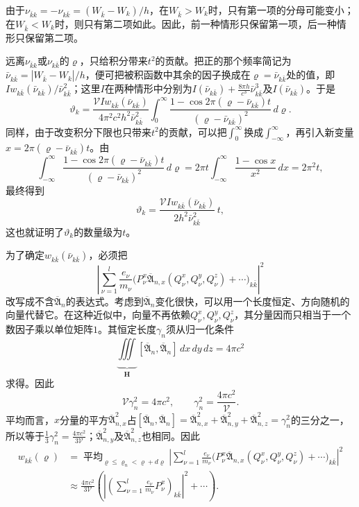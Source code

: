 \documentclass[fontsize=13pt,twoside,openany,headings=normal,parskip=false,bookmarkpackage=false,DIV=calc]{scrbook}
\begin{document}
由于$\nu_{\bar k k}=-\nu_{k\bar k}=(W_{\bar k}-W_k)/h$，在$W_{\bar k}>W_k$时，只有第一项的分母可能变小；在$W_{\bar k}<W_k$时，则只有第二项如此。因此，前一种情形只保留第一项，后一种情形只保留第二项。

远离$\nu_{\bar k k}$或$\nu_{k\bar k}$的$\varrho$，只给积分带来$t^2$的贡献。把正的那个频率简记为$\bar\nu_{k\bar k}=|W_{\bar k}-W_k|/h$，\hypertarget{origpage-155}{}\label{origpage-155}便可把被积函数中其余的因子换成在$\varrho=\bar\nu_{k\bar k}$处的值，即$I w_{k\bar k}(\bar\nu_{k\bar k})/\bar\nu_{k\bar k}^{2}$；这里$I$在两种情形中分别为$I(\bar\nu_{k\bar k})+\frac{8\pi h}{c^3}\bar\nu_{k\bar k}^{3}$及$I(\bar\nu_{k\bar k})$。于是
\[
 \vartheta_k=\frac{\mathcal V I w_{k\bar k}(\bar\nu_{k\bar k})}{4\pi^2c^2h^2\bar\nu_{k\bar k}^{2}}
 \int_0^{\infty}\frac{1-\cos2\pi(\varrho-\bar\nu_{k\bar k})t}{(\varrho-\bar\nu_{k\bar k})^2}\,d\varrho.
\]
同样，由于改变积分下限也只带来$t^2$的贡献，可以把$\int_0^{\infty}$换成$\int_{-\infty}^{\infty}$，再引入新变量$x=2\pi(\varrho-\bar\nu_{k\bar k})t$。由
\[
 \int_{-\infty}^{\infty}\frac{1-\cos2\pi(\varrho-\bar\nu_{k\bar k})t}{(\varrho-\bar\nu_{k\bar k})^2}\,d\varrho
 =2\pi t\int_{-\infty}^{\infty}\frac{1-\cos x}{x^2}\,dx=2\pi^2t,
\]
最终得到
\[
 \vartheta_k=\frac{\mathcal V I w_{k\bar k}(\bar\nu_{k\bar k})}{2h^2\bar\nu_{k\bar k}^{2}}\,t,
\]
这也就证明了$\vartheta_k$的数量级为$t$。

为了确定$w_{k\bar k}(\bar\nu_{k\bar k})$，必须把
\[
 \left|\sum_{\nu=1}^{l}\frac{e_\nu}{m_\nu}
 \bigl(P_\nu^x\overline{\mathfrak A}_{n,x}(Q_\nu^x,Q_\nu^y,Q_\nu^z)+\cdots\bigr)_{k\bar k}\right|^2
\]
改写成不含$\overline{\mathfrak A}_n$的表达式。考虑到$\overline{\mathfrak A}_n$变化很快，可以用一个长度恒定、方向随机的向量代替它。在这种近似中，向量不再依赖$Q_\nu^x,\allowbreak Q_\nu^y,\allowbreak Q_\nu^z$，其分量因而只相当于一个数因子乘以单位矩阵$1$。其恒定长度$\gamma_n$须从归一化条件
\[
 \underbrace{\iiint}_{\boldsymbol H}[\overline{\mathfrak A}_n,\overline{\mathfrak A}_n]\,dx\,dy\,dz=4\pi c^2
\]
求得。因此
\[
 \mathcal V\gamma_n^2=4\pi c^2,\qquad \gamma_n^2=\frac{4\pi c^2}{\mathcal V}.
\]
平均而言，$x$分量的平方$\overline{\mathfrak A}_{n,\allowbreak x}^{2}$占$[\overline{\mathfrak A}_n,\allowbreak \overline{\mathfrak A}_n]=\overline{\mathfrak A}_{n,\allowbreak x}^{2}+\overline{\mathfrak A}_{n,\allowbreak y}^{2}+\overline{\mathfrak A}_{n,\allowbreak z}^{2}=\gamma_n^2$的三分之一，所以等于$\frac13\gamma_n^2=\frac{4\pi c^2}{3\mathcal V}$；$\overline{\mathfrak A}_{n,\allowbreak y}^{2}$及$\overline{\mathfrak A}_{n,\allowbreak z}^{2}$也相同。因此
\begin{align*}
 w_{k\bar k}(\varrho)
 &=\mathop{\text{平均}}_{\varrho\le\varrho_n<\varrho+d\varrho}
 \left|\sum_{\nu=1}^{l}\frac{e_\nu}{m_\nu}
 \bigl(P_\nu^x\overline{\mathfrak A}_{n,x}(Q_\nu^x,Q_\nu^y,Q_\nu^z)+\cdots\bigr)_{k\bar k}\right|^2\\
 &\approx\frac{4\pi c^2}{3\mathcal V}
 \left(\left|\left(\sum_{\nu=1}^{l}\frac{e_\nu}{m_\nu}P_\nu^x\right)_{k\bar k}\right|^2+\cdots\right).
\end{align*}
\end{document}
